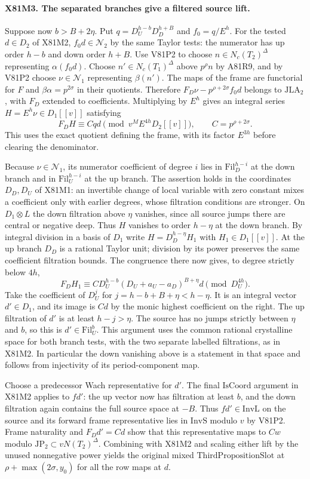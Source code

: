 \paragraph{X81M3. The separated branches give a filtered source lift.}
Suppose now $b>B+2\eta$. Put
$q=D_U^{h-b}D_D^{h+B}$ and $f_0=q/E^h$.
For the tested $d\in D_2$ of X81M2,
$f_0d\in\mathcal N_2$ by the same Taylor tests: the numerator
has up order $h-b$ and down order $h+B$. Use V81P2 to choose
$n\in N_c(T_2)^\Delta$ representing $\alpha(f_0d)$.
Choose $n'\in N_c(T_1)^\Delta$ above $p^\rho n$ by A81R9,
and by V81P2 choose $\nu\in\mathcal N_1$ representing
$\beta(n')$. The maps of the frame are functorial for $F$ and
$\beta\alpha=p^{2\sigma}$ in their quotients. Therefore
$F_D\nu-p^{\rho+2\sigma}f_0d$ belongs to $\mathrm{JLA}_2$,
with $F_D$ extended to coefficients. Multiplying by $E^h$ gives
an integral series $H=E^h\nu\in D_1[[v]]$ satisfying
\[
 F_D H\equiv C q d\pmod {v^M E^{4h} D_2[[v]]},
                 \qquad C=p^{\rho+2\sigma}.
\]
This uses the exact quotient defining the frame, with its factor
$E^{3h}$ before clearing the denominator.

Because $\nu\in\mathcal N_1$, its numerator coefficient of
degree $i$ lies in $\mathrm{Fil}_D^{h-i}$ at the down branch
and in $\mathrm{Fil}_U^{h-i}$ at the up branch. The assertion
holds in the coordinates $D_D,D_U$ of X81M1: an invertible
change of local variable with zero constant mixes a coefficient
only with earlier degrees, whose filtration conditions are
stronger. On $D_1\otimes L$ the down filtration above $\eta$
vanishes, since all source jumps there are central or negative
deep. Thus $H$ vanishes to order $h-\eta$ at the down branch.
By integral division in a basis of $D_1$ write
$H=D_D^{h-\eta}H_1$ with $H_1\in D_1[[v]]$.
At the up branch $D_D$ is a rational Taylor unit; division by
its power preserves the same coefficient filtration bounds.
The congruence there now gives, to degree strictly below $4h$,
\[
    F_D H_1\equiv C D_U^{h-b}(D_U+a_U-a_D)^{B+\eta}d
                    \pmod {D_U^{4h}}.
\]
Take the coefficient of $D_U^j$ for
$j=h-b+B+\eta<h-\eta$. It is an integral vector $d'\in D_1$,
and its image is $Cd$ by the monic highest coefficient on the
right. The up filtration of $d'$ is at least $h-j>\eta$.
The source has no jumps strictly between $\eta$ and $b$, so
this is $d'\in\mathrm{Fil}_U^b$. This argument uses the common
rational crystalline space for both branch tests, with the two
separate labelled filtrations, as in X81M2. In particular the
down vanishing above is a statement in that space and follows
from injectivity of its period-component map.

Choose a predecessor Wach representative for $d'$. The final
$\mathrm{IsCoord}$ argument in X81M2 applies to $fd'$:
the up vector now has filtration at least $b$, and the down
filtration again contains the full source space at $-B$.
Thus $fd'\in\mathrm{InvL}$ on the source and its forward frame
representative lies in $\mathrm{InvS}$ modulo $v$ by V81P2.
Frame naturality and $F_Dd'=Cd$ show that this representative
maps to $Cw$ modulo $\mathrm{JP}_2\subset vN(T_2)^\Delta$.
Combining with X81M2 and scaling either lift by the unused
nonnegative power yields the original mixed
$\mathrm{ThirdPropositionSlot}$ at
$\rho+\max(2\sigma,y_0)$ for all the row maps at $d$.

